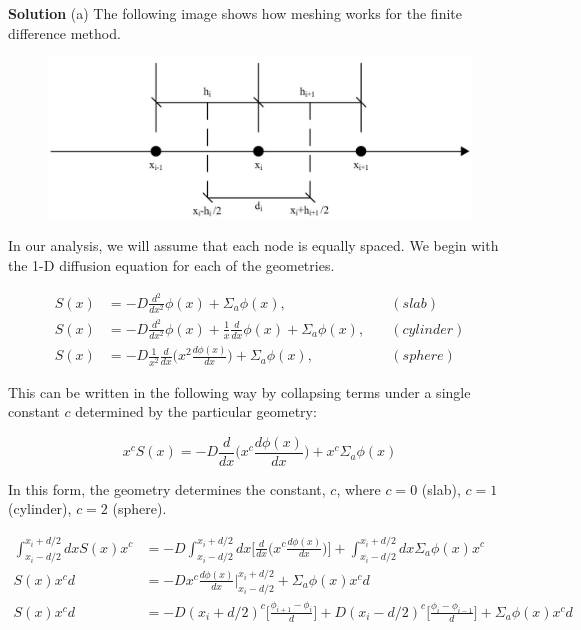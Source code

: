 \documentclass{amsart}
\theoremstyle{definition}
\begin{document}

\textbf{Solution}
\bigbreak
(a) The following image shows how meshing works for the finite difference method.
\bigbreak


\begin{figure}[h!]
    \includegraphics[width=.7\linewidth]{FD2}
\end{figure}


In our analysis, we will assume that each node is equally spaced.
We begin with the 1-D diffusion equation for each of the geometries.


\begin{align*}
    S(x) &= -D\frac{d^2}{dx^2}\phi(x) + \Sigma_a\phi(x), \quad &(slab)  \\
    S(x) &= -D\frac{d^2}{dx^2}\phi(x) + \frac{1}{x}\frac{d}{dx}\phi(x) +\Sigma_a\phi(x), \quad &(cylinder) \\
    S(x) &= -D\frac{1}{x^2}\frac{d}{dx}\bigg(x^2 \frac{d\phi(x)}{dx}\bigg) +\Sigma_a\phi(x), \quad &(sphere)
\end{align*}


This can be written in the following way by collapsing terms under a single constant $c$ determined by the particular geometry:

\begin{equation*}
    x^c S(x) = -D\frac{d}{dx}\bigg(x^c\frac{d\phi(x)}{dx}\bigg)+x^c\Sigma_a\phi(x)
\end{equation*}



In this form, the geometry determines the constant, $c$, where $c=0$ (slab), $c=1$ (cylinder), $c=2$ (sphere).

\begin{align*}
    \int_{x_i-d/2}^{x_i+d/2}dxS(x)x^c  &= -D\int_{x_i-d/2}^{x_i+d/2}dx\bigg[\frac{d}{dx}\bigg(x^c\frac{d\phi(x)}{dx}\bigg)\bigg]+\int_{x_i-d/2}^{x_i+d/2}dx \Sigma_a\phi(x)x^c \\
    S(x)x^cd &= -Dx^c\frac{d\phi(x)}{dx}\Biggr|_{x_i-d/2}^{x_i+d/2}+\Sigma_a\phi(x)x^cd \\
    S(x)x^cd &= -D(x_i+d/2)^c\bigg[\frac{\phi_{i+1}-\phi_i}{d}\bigg]+D(x_i-d/2)^c\bigg[\frac{\phi_i-\phi_{i-1}}{d}\bigg]+\Sigma_a\phi(x)x^cd
\end{align*}
\bigbreak
\end{document}
